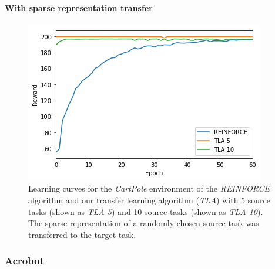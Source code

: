 \paragraph{With sparse representation transfer} %
\label{par:cartpole:with_sparse_representation_transfer}
\begin{figure}[H]
    \centering
    \includegraphics[width=.8\linewidth]{images/results/CartPole/sparse_transfer/reward_target_re-akt5-akt10.png}
    \caption[Learning curves for the \textit{CartPole} environment of \textit{REINFORCE} and \textit{TLA} using sparse representation transfer]{Learning curves for the \emph{CartPole} environment of the \textit{REINFORCE} algorithm and our transfer learning algorithm (\textit{TLA}) with 5 source tasks (shown as \textit{TLA 5}) and 10 source tasks (shown as \textit{TLA 10}). The sparse representation of a randomly chosen source task was transferred to the target task.}
    \label{fig:CartPole:st:reward_target_re-akt5-akt10}
\end{figure}

\subsubsection{Acrobot} %
\label{sub:acrobot}
